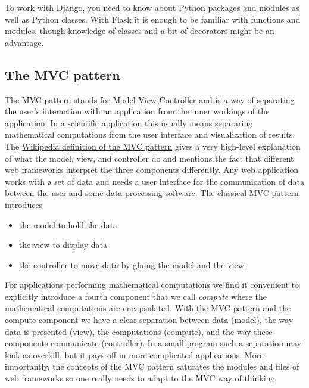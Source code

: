 \documentclass[%
oneside,                 %
final,                   %
10pt]{article}
\begin{document}
\noindent
To work with Django, you need to know about Python packages and modules
as well as Python classes. With Flask it is enough to be familiar with
functions and modules, though knowledge of classes and a bit of
decorators might be an advantage.

\subsection{The MVC pattern}


The MVC pattern stands for Model-View-Controller and is a way of
separating the user's interaction with an application from the inner
workings of the application. In a scientific application this
usually means separaring mathematical computations from the
user interface and visualization of results.
The \href{{http://en.wikipedia.org/wiki/MVC_Pattern}}{Wikipedia definition of the MVC pattern} gives a very high-level
explanation of what the model, view, and controller do and mentions
the fact that different web frameworks interpret the three components
differently. Any web application works with a set of data and needs
a user interface for the communication of data between the user and
some data processing software. The classical
MVC pattern introduces

\begin{itemize}
 \item the model to hold the data

 \item the view to display data

 \item the controller to move data by gluing the model and the view.
\end{itemize}

\noindent
For applications performing mathematical computations we find it
convenient to explicitly introduce a fourth component that we call
\emph{compute} where the mathematical computations are encapsulated.  With
the MVC pattern and the compute component we have a clear separation
between data (model), the way data is presented (view), the
computations (compute), and the way these components communicate
(controller). In a small program such a separation may look as
overkill, but it pays off in more complicated applications. More
importantly, the concepts of the MVC pattern saturates the modules and
files of web frameworks so one really needs to adapt to the MVC way of
thinking.
\end{document}

